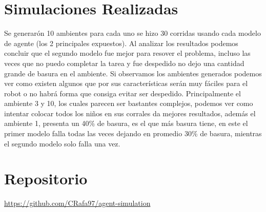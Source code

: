 \documentclass[a4paper,10pt,twocolumn]{article}
\begin{document}
\section*{Simulaciones Realizadas}

Se generar\'on 10 ambientes para cada uno se hizo 30 corridas usando cada modelo de agente (los 2 principales expuestos). Al analizar los resultados podemos concluir que el segundo modelo fue mejor para resover el problema, incluso las veces que no puedo completar la tarea y fue despedido no dejo una cantidad grande de basura en el ambiente. Si observamos los ambientes generados podemos ver como existen algunos que por sus caracter\'isticas ser\'an muy f\'aciles para el robot o no habr\'a forma que consiga evitar ser despedido. Principalmente el ambiente 3 y 10, los cuales parecen ser bastantes complejos, podemos ver como intentar colocar todos los ni\~nos en sus corrales da mejores resultados, adem\'as el ambiente 1, presenta un 40\% de basura, es el que m\'as basura tiene, en este el primer modelo falla todas las veces dejando en promedio 30\% de basura, mientras el segundo modelo solo falla una vez.



\section*{Repositorio}

\url{https://github.com/CRafa97/agent-simulation}

\begin{thebibliography}{9}
	
\end{thebibliography}

\label{end}
\end{document}
